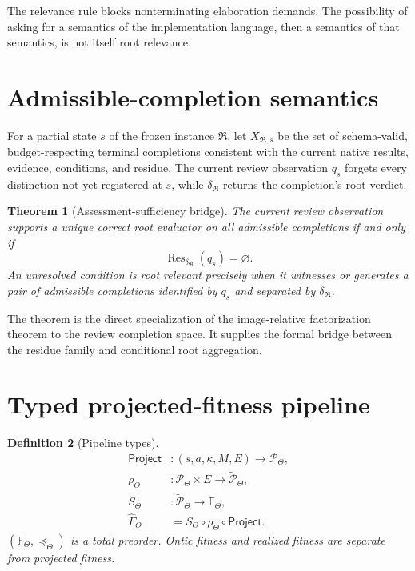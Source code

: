 \documentclass[10pt]{article}
\newtheorem{definition}{Definition}[section]
\newtheorem{theorem}[definition]{Theorem}
\newcommand{\Res}{\operatorname{Res}}
\newcommand{\Target}{\Theta}
\newcommand{\ProjFit}{\widehat F}
\newcommand{\Project}{\mathsf{Project}}
\begin{document}
The relevance rule blocks nonterminating elaboration demands.  The possibility of asking for a semantics of the implementation language, then a semantics of that semantics, is not itself root relevance.

\section{Admissible-completion semantics}

For a partial state $s$ of the frozen instance $\mathfrak R$, let $X_{\mathfrak R,s}$ be the set of schema-valid, budget-respecting terminal completions consistent with the current native results, evidence, conditions, and residue.  The current review observation $q_s$ forgets every distinction not yet registered at $s$, while $\delta_{\mathfrak R}$ returns the completion's root verdict.

\begin{theorem}[Assessment-sufficiency bridge]
The current review observation supports a unique correct root evaluator on all admissible completions if and only if
\[
\Res_{\delta_{\mathfrak R}}(q_s)=\varnothing.
\]
An unresolved condition is root relevant precisely when it witnesses or generates a pair of admissible completions identified by $q_s$ and separated by $\delta_{\mathfrak R}$.
\end{theorem}

The theorem is the direct specialization of the image-relative factorization theorem to the review completion space.  It supplies the formal bridge between the residue family and conditional root aggregation.

\section{Typed projected-fitness pipeline}

\begin{definition}[Pipeline types]
\[
\begin{aligned}
\Project &: (s,a,\kappa,M,E)\to\mathcal P_\Target,\\
\rho_\Target &: \mathcal P_\Target\times E\to\widetilde{\mathcal P}_\Target,\\
S_\Target &: \widetilde{\mathcal P}_\Target\to\mathbb F_\Target,\\
\ProjFit_\Target &= S_\Target\circ\rho_\Target\circ\Project.
\end{aligned}
\]
$(\mathbb F_\Target,\preceq_\Target)$ is a total preorder.  Ontic fitness and realized fitness are separate from projected fitness.
\end{definition}
\end{document}
